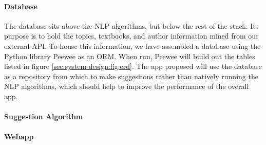 \paragraph{Database}
The database sits above the NLP algorithms, but below the rest of the
stack.
Its purpose is to hold the topics, textbooks, and author information
mined from our external API.  
To house this information, we have assembled a database using the
Python library Peewee as an ORM.
When run, Peewee will build out the tables listed in figure \ref{sec:system-design:fig:erd}.
The app proposed will use the database as a repository from which to
make suggestions rather than natively running the NLP algorithms,
which should help to improve the performance of the overall app.



\paragraph{Suggestion Algorithm}

\paragraph{Webapp}

